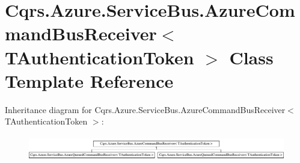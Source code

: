\hypertarget{classCqrs_1_1Azure_1_1ServiceBus_1_1AzureCommandBusReceiver}{}\section{Cqrs.\+Azure.\+Service\+Bus.\+Azure\+Command\+Bus\+Receiver$<$ T\+Authentication\+Token $>$ Class Template Reference}
\label{classCqrs_1_1Azure_1_1ServiceBus_1_1AzureCommandBusReceiver}
Inheritance diagram for Cqrs.\+Azure.\+Service\+Bus.\+Azure\+Command\+Bus\+Receiver$<$ T\+Authentication\+Token $>$\+:\begin{figure}[H]
\begin{center}
\leavevmode
\includegraphics[height=1.102362cm]{classCqrs_1_1Azure_1_1ServiceBus_1_1AzureCommandBusReceiver}
\end{center}
\end{figure}
